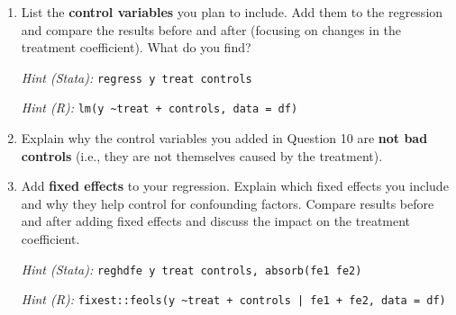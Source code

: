 \documentclass[paper=a4, fontsize=11pt]{scrartcl}
\begin{document}
\begin{enumerate}
\vspace{0.3cm}

\item List the \textbf{control variables} you plan to include. Add them to the regression and compare the results before and after (focusing on changes in the treatment coefficient). What do you find?

\textit{Hint (Stata):} \texttt{regress y treat controls}

\textit{Hint (R):} \texttt{lm(y \textasciitilde treat + controls, data = df)}

\vspace{0.3cm}

\item Explain why the control variables you added in Question 10 are \textbf{not bad controls} (i.e., they are not themselves caused by the treatment).

\vspace{0.3cm}

\item Add \textbf{fixed effects} to your regression. Explain which fixed effects you include and why they help control for confounding factors. Compare results before and after adding fixed effects and discuss the impact on the treatment coefficient.

\textit{Hint (Stata):} \texttt{reghdfe y treat controls, absorb(fe1 fe2)}

\textit{Hint (R):} \texttt{fixest::feols(y \textasciitilde treat + controls | fe1 + fe2, data = df)}

\end{enumerate}
\end{document}
